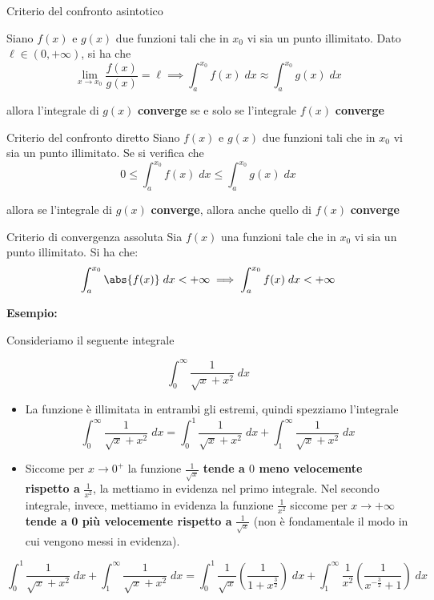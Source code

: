 \documentclass[a4paper, 12pt]{report}
\begin{document}
    \quad
    
    \begin{framedthm}{Criterio del confronto asintotico}

        Siano $f(x)$ e $g(x)$ due funzioni tali che in $x_0$ vi sia un punto illimitato. Dato $\ell \in (0, +\infty)$, si ha che
        \[ \lim_{x \to x_0} \frac{f(x)}{g(x)} = \ell \implies \int_{a}^{x_0} f(x) \; dx \approx \int_{a}^{x_0} g(x) \; dx\]
        
        allora l'integrale di $g(x)$ \textbf{converge} se e solo se l'integrale $f(x)$ \textbf{converge}
    \end{framedthm}
        
    \begin{framedthm}{Criterio del confronto diretto}
        Siano $f(x)$ e $g(x)$ due funzioni tali che in $x_0$ vi sia un punto illimitato. Se si verifica che
        \[ 0 \leq \int_{a}^{x_0} f(x) \; dx \leq \int_{a}^{x_0} g(x) \; dx\]
        
        allora se l'integrale di $g(x)$ \textbf{converge}, allora anche quello di $f(x)$ \textbf{converge}
    \end{framedthm}
    
    \begin{framedthm}{Criterio di convergenza assoluta}
        Sia $f(x)$ una funzioni tale che in $x_0$ vi sia un punto illimitato. Si ha che:
        \[ \int_{a}^{x_0} \abs{f(x)} \; dx < +\infty \implies \int_{a}^{x_0} f(x) \; dx < +\infty\]
    \end{framedthm}

    \newpage

    \textbf{Esempio:}
    
    Consideriamo il seguente integrale
        
    \[ \int_{0}^{\infty} \frac{1}{\sqrt{x}+x^2} \; dx\]
    
    \begin{itemize}
        \item La funzione è illimitata in entrambi gli estremi, quindi spezziamo l'integrale
        \[ \int_{0}^{\infty} \frac{1}{\sqrt{x}+x^2} \; dx = \int_{0}^{1} \frac{1}{\sqrt{x}+x^2} \; dx + \int_{1}^{\infty} \frac{1}{\sqrt{x}+x^2} \; dx\]
        
        \item Siccome per $x \to 0^+$ la funzione $\frac{1}{\sqrt{x}}$ \textbf{tende a $0$ meno velocemente rispetto a }$\frac{1}{x^2}$, la mettiamo in evidenza nel primo integrale. Nel secondo integrale, invece, mettiamo in evidenza la funzione $\frac{1}{x^2}$ siccome per $x \to +\infty$ \textbf{tende a 0 più velocemente rispetto a} $\frac{1}{\sqrt{x}}$ (non è fondamentale il modo in cui vengono messi in evidenza).
    \end{itemize}
    \[ \int_{0}^{1} \frac{1}{\sqrt{x}+x^2} \; dx + \int_{1}^{\infty} \frac{1}{\sqrt{x}+x^2} \; dx = \int_{0}^{1} \frac{1}{\sqrt{x}} \left ( \frac{1}{1+x^{\frac{3}{2}}} \right ) \; dx + \int_{1}^{\infty} \frac{1}{x^2} \left ( \frac{1}{x^{-\frac{3}{2}} + 1} \right ) \; dx\]
    
\end{document}
